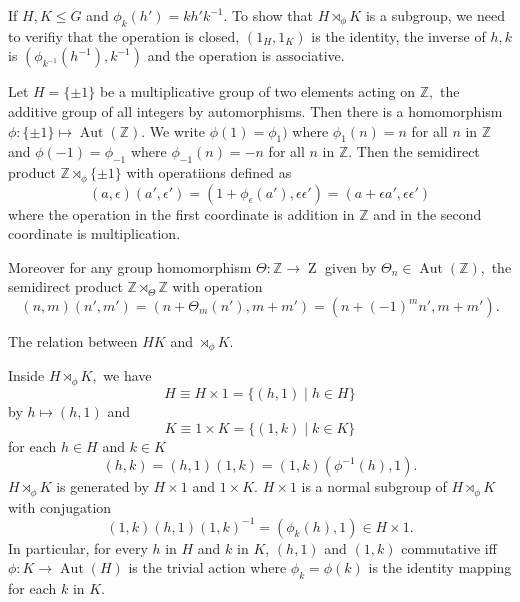 If $H, K \leq G$ and $ \phi_k(h') = k h' k^{-1}.$ To show that $H \rtimes_\phi K$
is a subgroup, we need to verifiy that
the operation is closed, $(1_H, 1_K) $ is the identity,
the inverse of $h,k$ is $(\phi_{k^{-1}} (h^{-1} ), k^{-1} )$
and the operation is associative.

\begin{example}
	Let $H = \{ \pm 1 \}$ be a multiplicative group of two elements acting on
	$\mathbb{Z},$ the additive group of all integers by automorphisms. Then 
	there is a homomorphism $ \phi \colon \{ \pm 1 \} \mapsto \operatorname{Aut}
	(\mathbb{Z}).$ We write $\phi(1) = \phi_1)$ where $ \phi_1(n) = n$ 
	for all $n$ in $\mathbb{Z}$ and $ \phi(-1) = \phi_{-1}$ where
	$ \phi_{-1} (n) = -n$ for all $n$ in $\mathbb{Z}.$
	Then the semidirect product $ \mathbb{Z} \rtimes_{ \phi} \{ \pm 1 \}$ with
	operatiions defined as
	$$ (a, \epsilon) (a', \epsilon')=  (1 + \phi_\epsilon(a'), \epsilon \epsilon')
	= (a + \epsilon a', \epsilon \epsilon')$$
	where the operation in the first coordinate is addition in $\mathbb{Z}$ and in the
	second coordinate is multiplication.
\end{example}

Moreover for any group homomorphism $ \Theta \colon \mathbb{Z} \to \operatorname{Z}$
given by $\Theta_n \in \operatorname{Aut}(\mathbb{Z}),$ the semidirect product
$ \mathbb{Z} \rtimes_\Theta \mathbb{Z}$ with operation
$$ (n,m)(n',m') = (n + \Theta_m(n'), m + m')
= (n + (-1)^m n', m + m') .$$


The relation between $H K$ and $ \rtimes_\phi K.$

\begin{theorem}
	Inside $H \rtimes_\phi K,$ we have
	$$ H \equiv H \times  1 = \{ (h,1) \; | \; h \in H \} $$
	by $ h \mapsto (h,1) $
	and 
	$$ K \equiv 1 \times  K = \{ (1, k) \; | \; k \in K \} $$
	for each $ h \in H $ and $k \in K$
	$$(h,k) = (h, 1) (1, k) = (1,k) (\phi^{-1} (h), 1) .$$
	$H \rtimes_\phi K$ is generated by $ H \times 1$ and $1 \times K.$
	$H \times 1$ is a normal subgroup of $H \rtimes_\phi K$ with
	conjugation
	$$(1,k)(h,1)(1,k)^{-1}= (\phi_k(h), 1) \in H \times  1.$$
	In particular, for every $h$ in $H$ and $k$ in $K$,
	$(h,1)$ and $(1,k)$ commutative iff $ \phi \colon K \to \operatorname{Aut}(H)$
	is the trivial action where $\phi_k = \phi(k)$ is the identity mapping for each $k$
	in $K.$
\end{theorem}
